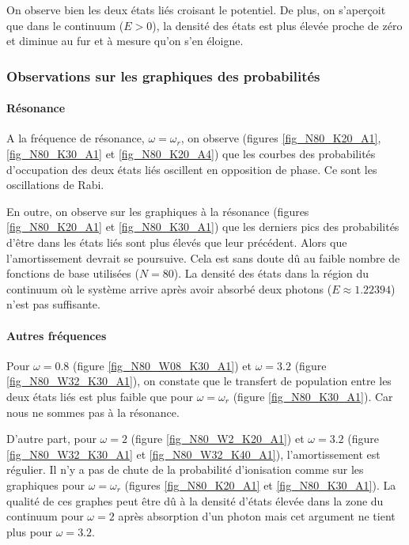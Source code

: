 \documentclass{report}
\begin{document}
On observe bien les deux états liés croisant le potentiel. De plus, on s'aperçoit que dans le continuum ($E>0$), la densité des états est plus élevée proche de zéro et diminue au fur et à mesure qu'on s'en éloigne.

\subsubsection{Observations sur les graphiques des probabilités}

\paragraph{Résonance}

A la fréquence de résonance, $\omega = \omega_{r}$, on observe (figures \ref{fig_N80_K20_A1}, \ref{fig_N80_K30_A1} et \ref{fig_N80_K20_A4}) que les courbes des probabilités d'occupation des deux états liés oscillent en opposition de phase. Ce sont les oscillations de Rabi.

En outre, on observe sur les graphiques à la résonance (figures \ref{fig_N80_K20_A1} et \ref{fig_N80_K30_A1}) que les derniers pics des probabilités d'être dans les états liés sont plus élevés que leur précédent. Alors que l'amortissement devrait se poursuive. Cela est sans doute dû au faible nombre de fonctions de base utilisées ($N=80$). La densité des états dans la région du continuum où le système arrive après avoir absorbé deux photons ($E \approx 1.22394$) n'est pas suffisante.

\paragraph{Autres fréquences}

Pour $\omega = 0.8$ (figure \ref{fig_N80_W08_K30_A1}) et $\omega = 3.2$ (figure \ref{fig_N80_W32_K30_A1}), on constate que le transfert de population entre les deux états liés est plus faible que pour $\omega = \omega_{r}$ (figure \ref{fig_N80_K30_A1}). Car nous ne sommes pas à la résonance.

D'autre part, pour $\omega = 2$ (figure \ref{fig_N80_W2_K20_A1}) et $\omega = 3.2$ (figure \ref{fig_N80_W32_K30_A1} et \ref{fig_N80_W32_K40_A1}), l'amortissement est régulier. Il n'y a pas de chute de la probabilité d'ionisation comme sur les graphiques pour $\omega = \omega_{r}$ (figures \ref{fig_N80_K20_A1} et \ref{fig_N80_K30_A1}). La qualité de ces graphes peut être dû à la densité d'états élevée dans la zone du continuum pour $\omega = 2$ après absorption d'un photon mais cet argument ne tient plus pour $\omega = 3.2$.
\end{document}
